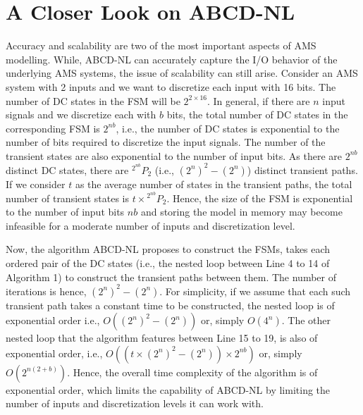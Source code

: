 \documentclass[a4paper]{article}
\newcommand*{\Perm}[2]{{}^{#1}\!P_{#2}}%
\begin{document}
\section{A Closer Look on ABCD-NL}\label{sec:closer}
Accuracy and scalability are two of the most important aspects of AMS modelling. While, ABCD-NL can accurately capture the I/O behavior of the underlying AMS systems, the issue of  scalability can still arise. Consider an AMS system with 2 inputs and we want to discretize each input with 16 bits. The number of DC states in the FSM will be $2^{2 \times 16}$. In general, if there are $n$ input signals and we discretize each with $b$ bits, the total number of DC states in the corresponding FSM is $2^{nb}$, i.e., the number of DC states is exponential to the number of bits required to discretize the input signals. The number of the transient states are also exponential to the number of input bits. As there are $2^{nb}$ distinct DC states, there are $\Perm{2^{nb}}{2}$ (i.e., $ (2^n)^2 - (2^n) $) distinct transient paths. If we consider $t$ as the average number of states in the transient paths, the total number of transient states is $ t \times \Perm{2^{nb}}{2} $. Hence, the size of the FSM is exponential to the number of input bits $nb$ and storing the model in memory may become infeasible for a moderate number of inputs and discretization level. 

Now, the algorithm ABCD-NL proposes to construct the FSMs, takes each ordered pair of the DC states (i.e., the nested loop between Line 4 to 14 of Algorithm 1) to construct the transient paths between them. The number of iterations is hence, $ (2^n)^2 - (2^n) $. For simplicity, if we assume that each such transient path takes a constant time to be constructed, the nested loop is of exponential order i.e., $O((2^n)^2 - (2^n))$ or, simply $O(4^n)$. The other nested loop that the algorithm features between Line 15 to 19, is also of exponential order, i.e., $O( (t \times (2^n)^2 - (2^n)) \times 2^{nb})$ or, simply $O(2^{n(2+b)})$. Hence, the overall time complexity of the algorithm is of exponential order, which limits the capability of ABCD-NL by limiting the number of inputs and discretization levels it can work with.

 
\end{document}
